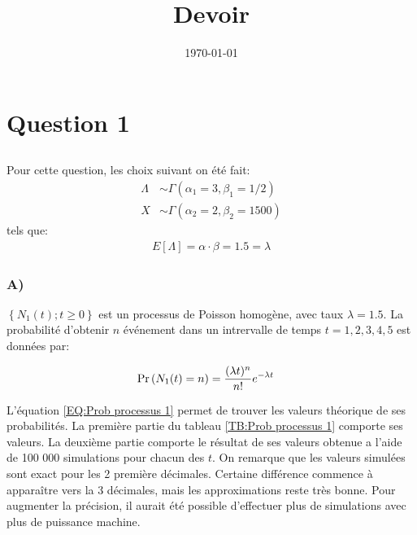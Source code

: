 \documentclass[12pt, french]{report}
\title{Devoir}
\date{\today}
\begin{document}

\newpage
\tableofcontents
\newpage


\chapter*{Question 1}
\addtocounter{chapter}{1}
\section{}
Pour cette question, les choix suivant on été fait:
\begin{align*}
    \Lambda &\sim \Gamma{(\alpha_1 = 3, \beta_1 = 1/2)} \\
    X &\sim  \Gamma{(\alpha_2 = 2, \beta_2 = 1500)}
\end{align*}
tels que:
\begin{align*}
    E[\Lambda] = \alpha \cdot \beta = 1.5 = \lambda 
\end{align*}

\subsection*{A)}
$\left\{ N_1(t);t \geq 0 \right\}$ est un processus de Poisson homogène, avec taux $\lambda = 1.5$.
La probabilité d'obtenir $n$ événement dans un intrervalle de temps $t = 1,2,3,4,5$ est données par:

\begin{align}
    \label{EQ:Prob processus 1}
    \Pr \left( N_1(t)=n \right) &= \frac{(\lambda t)^n}{n!} e^{-\lambda t} 
\end{align}

L'équation \ref{EQ:Prob processus 1} permet de trouver les valeurs théorique de ses probabilités. La première 
partie du tableau \ref{TB:Prob processus 1} comporte ses valeurs. La deuxième partie comporte le résultat de 
ses valeurs obtenue a l'aide de 100 000 simulations pour chacun des $t$. On remarque que les valeurs simulées sont exact pour les 2 première
décimales. Certaine différence commence à apparaître vers la 3 décimales, mais les approximations reste très bonne.
Pour augmenter la précision, il aurait été possible d'effectuer plus de simulations avec plus de puissance machine.
\end{document}
